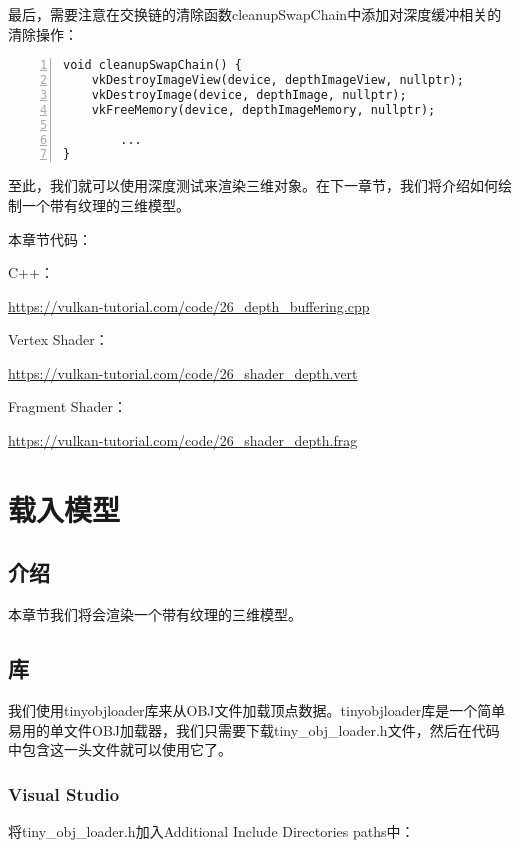 \documentclass{ctexart}
\begin{document}
最后，需要注意在交换链的清除函数cleanupSwapChain中添加对深度缓冲相关的清除操作：

\begin{lstlisting}[language={[ANSI]C},keywordstyle=\color{blue!70},commentstyle=\color{red!50!green!50!blue!50},frame=shadowbox, rulesepcolor=\color{red!20!green!20!blue!20},basicstyle=\small,numbers=left, numberstyle=\tiny,breaklines=true]
void cleanupSwapChain() {
	vkDestroyImageView(device, depthImageView, nullptr);
	vkDestroyImage(device, depthImage, nullptr);
	vkFreeMemory(device, depthImageMemory, nullptr);

		...
}
\end{lstlisting}

至此，我们就可以使用深度测试来渲染三维对象。在下一章节，我们将介绍如何绘制一个带有纹理的三维模型。

本章节代码：

C++：

\url{https://vulkan-tutorial.com/code/26_depth_buffering.cpp}

Vertex Shader：

\url{https://vulkan-tutorial.com/code/26_shader_depth.vert}

Fragment Shader：

\url{https://vulkan-tutorial.com/code/26_shader_depth.frag}

\newpage
\section{载入模型}

\subsection{介绍}

本章节我们将会渲染一个带有纹理的三维模型。

\subsection{库}

我们使用tinyobjloader库来从OBJ文件加载顶点数据。tinyobjloader库是一个简单易用的单文件OBJ加载器，我们只需要下载tiny\_obj\_loader.h文件，然后在代码中包含这一头文件就可以使用它了。

\subsubsection{Visual Studio}

将tiny\_obj\_loader.h加入Additional Include Directories paths中：
\end{document}
